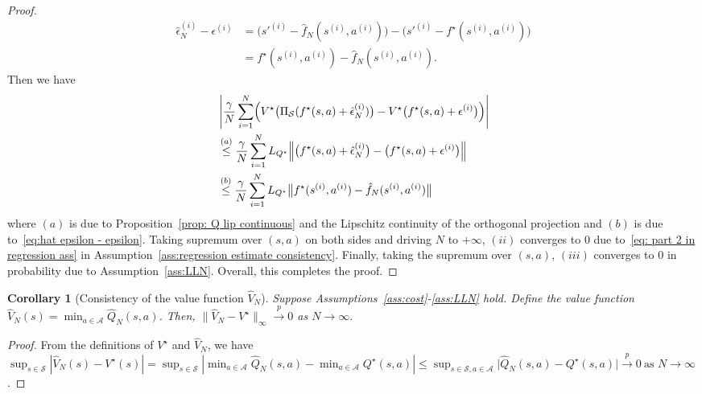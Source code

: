\documentclass[letterpaper, 10 pt, conference]{ieeeconf}  %
\newtheorem{corollary}{Corollary}
\begin{document}
\begin{proof}
\begin{align}
    \hat{\epsilon}_N^{(i)} - \epsilon^{(i)} &= \bigl(s'^{(i)} - \hat{f}_N(s^{(i)},a^{(i)})\bigr)-\bigl(s'^{(i)} - f^\star(s^{(i)},a^{(i)})\bigr)\nonumber\\
    & =f^\star(s^{(i)},a^{(i)}) - \hat{f}_N(s^{(i)},a^{(i)}).
\end{align}
Then we have
\small
\begin{align}
&\left|\frac{\gamma}{N} \sum_{i=1}^N \Bigl(V^\star\bigl(\Pi_{\mathcal S}(f^\star(s,a)+\hat\epsilon_N^{(i)})\bigr)
-V^\star\bigl(f^\star(s,a)+\epsilon^{(i)}\bigr)\Bigr)\right|\nonumber\\
&\overset{(a)}{\le} \frac{\gamma}{N} \sum_{i=1}^N L_{Q^\star}\Bigl\|\bigl(f^\star(s,a)+\hat\epsilon_N^{(i)}\bigr) - \bigl(f^\star(s,a)+\epsilon^{(i)}\bigr)\Bigr\|\nonumber\\
& \overset{(b)}{\le} \frac{\gamma}{N} \sum_{i=1}^N L_{Q^\star}\bigl\|f^\star(s^{(i)},a^{(i)}) - \hat{f}_N(s^{(i)},a^{(i)})\bigr\|\nonumber
\end{align}
\normalsize
where $(a)$ is due to Proposition\ \ref{prop: Q lip continuous} and the Lipschitz continuity of the orthogonal projection and $(b)$ is due to\ \eqref{eq:hat epsilon - epsilon}. Taking supremum over $(s,a)$ on both sides and driving $N$ to $+\infty$, $(ii)$ converges to 0 due to\ \eqref{eq: part 2 in regression ass} in Assumption\ \ref{ass:regression estimate consistency}. Finally, taking the supremum over $(s,a)$, $(iii)$ converges to $0$ in probability due to Assumption\ \ref{ass:LLN}. Overall, this completes the proof. 
\end{proof}
\begin{corollary}[Consistency of the value function $\hat{V}_N$]\label{coro:vn consistency}
Suppose Assumptions\ \ref{ass:cost}-\ref{ass:LLN} hold. Define the value function $ \hat{V}_N(s)=\min_{a\in\mathcal A} \hat{Q}_N(s,a)$.
Then, $\|\hat{V}_N - V^\star\|_{\infty} \xrightarrow{p} 0$ as $N \to \infty.$
\end{corollary}
\begin{proof}
From the definitions of $V^\star$ and $\hat{V}_N$, we  have
$\sup_{s\in\mathcal S}|\hat{V}_N(s)-V^\star(s)| =\sup_{s\in\mathcal S}\left|\min_{a\in\mathcal A}\hat{Q}_N(s,a)-\min_{a\in\mathcal A}Q^\star(s,a)\right| \le \sup_{s\in\mathcal S,a\in\mathcal A}\bigl|\hat{Q}_N(s,a)-Q^\star(s,a)\bigr|\xrightarrow{p} 0 \ \text{as } N\to\infty$.
\end{proof}
\end{document}
